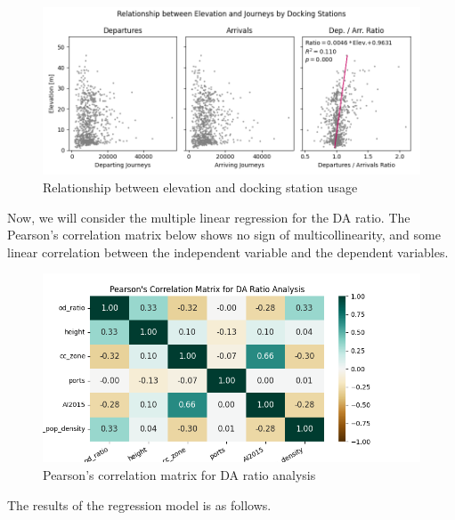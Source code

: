 \documentclass[
  a4paper,
  DIV=11,
  numbers=noendperiod]{scrartcl}
\begin{document}
\begin{figure}

{\centering \includegraphics{img/elev_scatter.png}

}

\caption{Relationship between elevation and docking station usage}

\end{figure}

Now, we will consider the multiple linear regression for the DA ratio.
The Pearson's correlation matrix below shows no sign of
multicollinearity, and some linear correlation between the independent
variable and the dependent variables.

\begin{figure}

{\centering \includegraphics{img/cor_matrix_DA.png}

}

\caption{Pearson's correlation matrix for DA ratio analysis}

\end{figure}

The results of the regression model is as follows.
\end{document}
